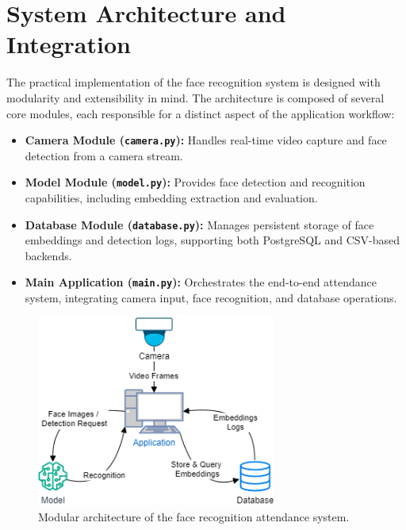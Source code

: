 \section{System Architecture and Integration}

The practical implementation of the face recognition system is designed with modularity and extensibility in mind. The architecture is composed of several core modules, each responsible for a distinct aspect of the application workflow:
\begin{itemize}
    \item \textbf{Camera Module (\texttt{camera.py}):} Handles real-time video capture and face detection from a camera stream.
    \item \textbf{Model Module (\texttt{model.py}):} Provides face detection and recognition capabilities, including embedding extraction and evaluation.
    \item \textbf{Database Module (\texttt{database.py}):} Manages persistent storage of face embeddings and detection logs, supporting both PostgreSQL and CSV-based backends.
    \item \textbf{Main Application (\texttt{main.py}):} Orchestrates the end-to-end attendance system, integrating camera input, face recognition, and database operations.
\end{itemize}

\begin{figure}[ht!]
    \centering
    \includegraphics[width=0.7\textwidth]{../Files/system_architecture.png}
    \caption{Modular architecture of the face recognition attendance system.}
    \label{fig:system-architecture}
\end{figure}

